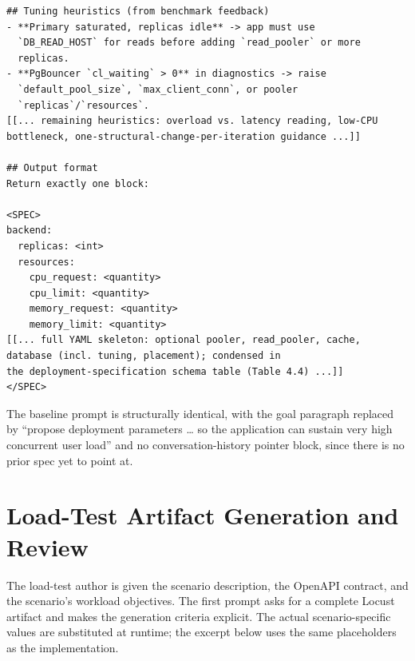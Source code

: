 \begin{verbatim}
## Tuning heuristics (from benchmark feedback)
- **Primary saturated, replicas idle** -> app must use
  `DB_READ_HOST` for reads before adding `read_pooler` or more
  replicas.
- **PgBouncer `cl_waiting` > 0** in diagnostics -> raise
  `default_pool_size`, `max_client_conn`, or pooler
  `replicas`/`resources`.
[[... remaining heuristics: overload vs. latency reading, low-CPU
bottleneck, one-structural-change-per-iteration guidance ...]]

## Output format
Return exactly one block:

<SPEC>
backend:
  replicas: <int>
  resources:
    cpu_request: <quantity>
    cpu_limit: <quantity>
    memory_request: <quantity>
    memory_limit: <quantity>
[[... full YAML skeleton: optional pooler, read_pooler, cache,
database (incl. tuning, placement); condensed in
the deployment-specification schema table (Table 4.4) ...]]
</SPEC>
\end{verbatim}
\normalsize

The baseline prompt is structurally identical, with the goal paragraph
replaced by ``propose deployment parameters \ldots{} so the application
can sustain very high concurrent user load'' and no conversation-history
pointer block, since there is no prior spec yet to point at.


\section{Load-Test Artifact Generation and Review}
\label{sec:appendix-prompts-load}

The load-test author is given the scenario description, the OpenAPI contract,
and the scenario's workload objectives. The first prompt asks for a complete
Locust artifact and makes the generation criteria explicit. The actual
scenario-specific values are substituted at runtime; the excerpt below uses
the same placeholders as the implementation.

